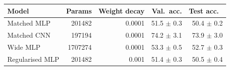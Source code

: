 \begin{tabular}{lrrrr}
\hline
Model & Params & Weight decay & Val.\ acc. & Test acc.\ \\
\hline
Matched MLP & 201482 & 0.0001 & 51.5 $\pm$ 0.3 & 50.4 $\pm$ 0.2 \\
Matched CNN & 197194 & 0.0001 & 74.2 $\pm$ 3.1 & 73.9 $\pm$ 3.0 \\
Wide MLP & 1707274 & 0.0001 & 53.3 $\pm$ 0.5 & 52.7 $\pm$ 0.3 \\
Regularised MLP & 201482 & 0.001 & 51.4 $\pm$ 0.3 & 50.5 $\pm$ 0.4 \\
\hline
\end{tabular}

